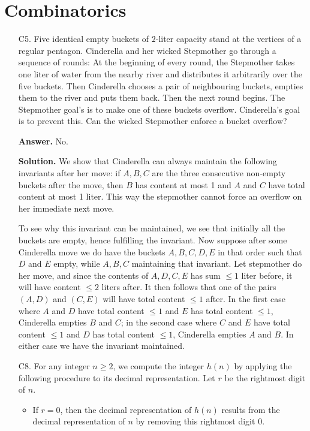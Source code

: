\documentclass[11pt,a4paper]{article}
\begin{document}
    \section*{Combinatorics}
    \begin{enumerate}
    	\item [C5.]
    	Five identical empty buckets of $2$-liter capacity stand at the vertices of a regular pentagon. Cinderella and her wicked Stepmother go through a sequence of rounds: At the beginning of every round, the Stepmother takes one liter of water from the nearby river and distributes it arbitrarily over the five buckets. Then Cinderella chooses a pair of neighbouring buckets, empties them to the river and puts them back. Then the next round begins. The Stepmother goal's is to make one of these buckets overflow. Cinderella's goal is to prevent this. Can the wicked Stepmother enforce a bucket overflow?
    	
    	\textbf{Answer.} No. 
    	
    	\textbf{Solution.} We show that Cinderella can always maintain the following invariants after her move: 
    	if $A, B, C$ are the three consecutive non-empty buckets after the move, then $B$ has content at most 1 and $A$ and $C$ have total content at most 1 liter. 
    	This way the stepmother cannot force an overflow on her immediate next move. 
    	
    	To see why this invariant can be maintained, we see that initially all the buckets are empty, hence fulfilling the invariant. 
    	Now suppose after some Cinderella move we do have the buckets $A, B, C, D, E$ in that order such that $D$ and $E$ empty, while $A, B, C$ maintaining that invariant. 
    	Let stepmother do her move, and since the contents of $A, D, C, E$ has sum $\le 1$ liter before, it will have content $\le 2$ liters after. 
    	It then follows that one of the pairs $(A, D)$ and $(C, E)$ will have total content $\le 1$ after. 
    	In the first case where $A$ and $D$ have total content $\le 1$ and $E$ has total content $\le 1$, Cinderella empties $B$ and $C$; 
    	in the second case where $C$ and $E$ have total content $\le 1$ and $D$ has total content $\le 1$, Cinderella empties $A$ and $B$. 
    	In either case we have the invariant maintained. 
    	
    	\item[C8.]
    	For any integer $n\geq 2$, we compute the integer $h(n)$ by applying the following procedure to its decimal representation. Let $r$ be the rightmost digit of $n$.
    	\begin{itemize}
    		\item If $r=0$, then the decimal representation of $h(n)$ results from the decimal representation of $n$ by removing this rightmost digit $0$.
    		

\end{itemize}
\end{enumerate}
\end{document}

